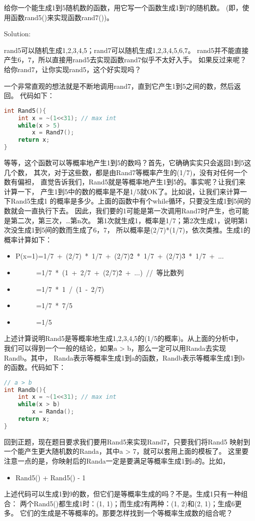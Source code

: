 \begin{description}
给你一个能生成1到5随机数的函数，用它写一个函数生成1到7的随机数。 (即，使用函数rand5()来实现函数rand7())。

Solution: 

rand5可以随机生成1,2,3,4,5；rand7可以随机生成1,2,3,4,5,6,7。 rand5并不能直接产生6，7，所以直接用rand5去实现函数rand7似乎不太好入手。 如果反过来呢？给你rand7，让你实现rand5，这个好实现吗？

一个非常直观的想法就是不断地调用rand7，直到它产生1到5之间的数，然后返回。 代码如下：
\begin{lstlisting}[language=C++]
int Rand5(){
    int x = ~(1<<31); // max int
    while(x > 5)
        x = Rand7();
    return x;
}
\end{lstlisting}
等等，这个函数可以等概率地产生1到5的数吗？首先，它确确实实只会返回1到5这几个数， 其次，对于这些数，都是由Rand7等概率产生的(1/7)，没有对任何一个数有偏袒， 直觉告诉我们，Rand5就是等概率地产生1到5的。事实呢？让我们来计算一下， 产生1到5中的数的概率是不是1/5就OK了。比如说，让我们来计算一下Rand5生成1 的概率是多少。上面的函数中有个while循环，只要没生成1到5间的数就会一直执行下去。 因此，我们要的1可能是第一次调用Rand7时产生，也可能是第二次，第三次，…第n次。 第1次就生成1，概率是1/7；第2次生成1，说明第1次没生成1到5间的数而生成了6，7， 所以概率是(2/7)*(1/7)，依次类推。生成1的概率计算如下：
\begin{itemize}
\item P(x=1)=1/7\ +\ (2/7)\ *\ 1/7\ +\ (2/7)\^2\ *\ 1/7\ +\ (2/7)\^3\ *\ 1/7\ +\ ...
\item \ \ \ \ \ \ =1/7\ *\ (1\ +\ 2/7\ +\ (2/7)\^2\ +\ ...)\ //\ 等比数列
\item \ \ \ \ \ \ =1/7\ *\ 1\ /\ (1\ -\ 2/7)
\item \ \ \ \ \ \ =1/7\ *\ 7/5
\item \ \ \ \ \ \ =1/5
\end{itemize}
上述计算说明Rand5是等概率地生成1,2,3,4,5的(1/5的概率)。从上面的分析中， 我们可以得到一个一般的结论，如果a > b，那么一定可以用Randa去实现Randb。其中， Randa表示等概率生成1到a的函数，Randb表示等概率生成1到b的函数。代码如下：
\begin{lstlisting}[language=C++]
// a > b
int Randb(){
    int x = ~(1<<31); // max int
    while(x > b)
        x = Randa();
    return x;
}
\end{lstlisting}
回到正题，现在题目要求我们要用Rand5来实现Rand7，只要我们将Rand5 映射到一个能产生更大随机数的Randa，其中a > 7，就可以套用上面的模板了。 这里要注意一点的是，你映射后的Randa一定是要满足等概率生成1到a的。比如，
\begin{itemize}
\item Rand5() + Rand5() - 1
\end{itemize}
上述代码可以生成1到9的数，但它们是等概率生成的吗？不是。生成1只有一种组合： 两个Rand5()都生成1时：(1, 1)；而生成2有两种：(1, 2)和(2, 1)；生成6更多。 它们的生成是不等概率的。那要怎样找到一个等概率生成数的组合呢？


\end{description}
